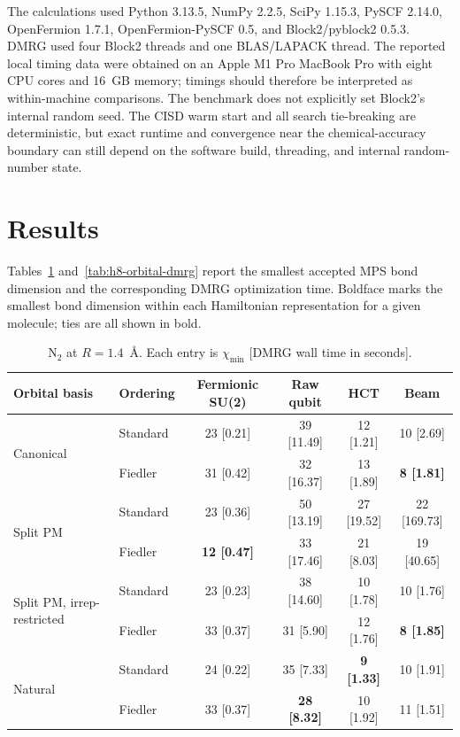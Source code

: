 \documentclass[a4paper,onecolumn,10pt]{article}
\begin{document}
The calculations used Python 3.13.5, NumPy 2.2.5, SciPy 1.15.3, PySCF 2.14.0,
OpenFermion 1.7.1, OpenFermion-PySCF 0.5, and Block2/pyblock2 0.5.3.  DMRG
used four Block2 threads and one BLAS/LAPACK thread.  The reported local timing
data were obtained on an Apple M1 Pro MacBook Pro with eight CPU cores and
16~GB memory; timings should therefore be interpreted as within-machine
comparisons.  The benchmark does not explicitly set Block2's internal random
seed.  The CISD warm start and all search tie-breaking are deterministic, but
exact runtime and convergence near the chemical-accuracy boundary can still
depend on the software build, threading, and internal random-number state.

\section{Results}

Tables~\ref{tab:n2-orbital-dmrg} and~\ref{tab:h8-orbital-dmrg} report the
smallest accepted MPS bond dimension and the corresponding DMRG optimization
time.  Boldface marks the smallest bond dimension within each Hamiltonian
representation for a given molecule; ties are all shown in bold.

\begin{table}[htbp]
\centering
\caption{N$_2$ at $R=1.4$~\AA.  Each entry is
$\chi_{\min}$ [DMRG wall time in seconds].}
\label{tab:n2-orbital-dmrg}
\begin{tabular}{llcccc}
\toprule
Orbital basis & Ordering & Fermionic SU(2) & Raw qubit & HCT & Beam \\
\midrule
\multirow{2}{*}{Canonical}
 & Standard & 23 [0.21] & 39 [11.49] & 12 [1.21] & 10 [2.69] \\
 & Fiedler  & 31 [0.42] & 32 [16.37] & 13 [1.89] & \textbf{8 [1.81]} \\
\midrule
\multirow{2}{*}{Split PM}
 & Standard & 23 [0.36] & 50 [13.19] & 27 [19.52] & 22 [169.73] \\
 & Fiedler  & \textbf{12 [0.47]} & 33 [17.46] & 21 [8.03] & 19 [40.65] \\
\midrule
\multirow{2}{*}{Split PM, irrep-restricted}
 & Standard & 23 [0.23] & 38 [14.60] & 10 [1.78] & 10 [1.76] \\
 & Fiedler  & 33 [0.37] & 31 [5.90] & 12 [1.76] & \textbf{8 [1.85]} \\
\midrule
\multirow{2}{*}{Natural}
 & Standard & 24 [0.22] & 35 [7.33] & \textbf{9 [1.33]} & 10 [1.91] \\
 & Fiedler  & 33 [0.37] & \textbf{28 [8.32]} & 10 [1.92] & 11 [1.51] \\
\bottomrule
\end{tabular}
\end{table}
\end{document}
